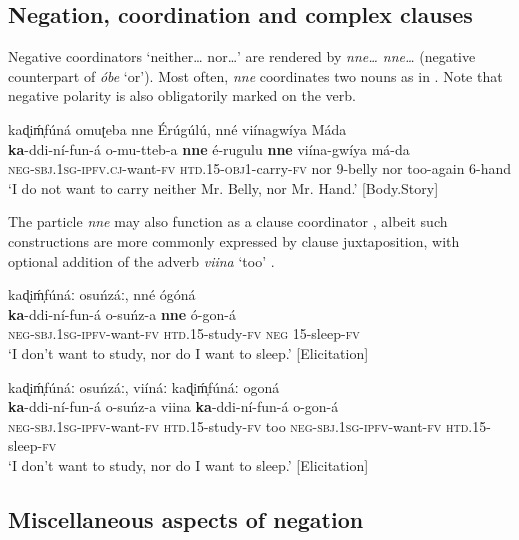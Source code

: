 \documentclass[output=paper,colorlinks=true, citecolor=brown,draftmode]{langscibook}
\begin{document}
\subsection{Negation, coordination and complex clauses}\label{sec:cuw:4.5}
Negative coordinators ‘neither… nor…’ are rendered by \textit{nne… nne…} (negative counterpart of \textit{óbe} ‘or’). Most often, \textit{nne} coordinates two nouns as in . Note that negative polarity is also obligatorily marked on the verb.

\ea\label{ex:cuw:79} kaɖiḿ̩fúná omuʈeba nne \'{E}rúgúlú, nné viínagwíya Máda \\
    \gll \textbf{ka}{}-ddi-ní-fun-á o-mu-tteb-a \textbf{nne} é-rugulu \textbf{nne} viína-gwíya má-da\\
          \textsc{neg-sbj.1}\textsc{sg}{}-\textsc{ipfv}.\textsc{cj}{}-want-\textsc{fv} \textsc{htd.15}{}-\textsc{obj1}{}-carry-\textsc{fv} nor 9-belly nor too-again 6-hand  \\
    \glt  ‘I do not want to carry neither Mr. Belly, nor Mr. Hand.’ [Body.Story]

\z 

The particle \textit{nne} may also function as a clause coordinator , albeit such constructions are more commonly expressed by clause juxtaposition, with optional addition of the adverb \textit{viina} ‘too’ . 

\ea\label{ex:cuw:80}
    \ea\label{ex:cuw:80a} kaɖiḿ̩fúnáː osuńzáː, nné ógóná\\ 
        \gll \textbf{ka}{}-ddi-ní-fun-á o-suńz-a \textbf{nne} ó-gon-á  \\
               \textsc{neg-sbj.1sg-ipfv}{}-want-\textsc{fv} \textsc{htd.15}{}-study-\textsc{fv} \textsc{neg} \textsc{15}{}-sleep-\textsc{fv}\\
        \glt  ‘I don’t want to study, nor do I want to sleep.’ [Elicitation]

    \ex\label{ex:cuw:80b} kaɖiḿ̩fúnáː osuńzáː, viínáː kaɖiḿ̩fúnáː ogoná \\
        \gll  \textbf{ka}{}-ddi-ní-fun-á o-suńz-a viina \textbf{ka}{}-ddi-ní-fun-á o-gon-á\\
               \textsc{neg-sbj.1sg-ipfv}{}-want-\textsc{fv} \textsc{htd.15}{}-study-\textsc{fv} too \textsc{neg-sbj.1sg-ipfv}{}-want-\textsc{fv} \textsc{htd.15}{}-sleep-\textsc{fv}\\
        \glt  ‘I don’t want to study, nor do I want to sleep.’ [Elicitation]
    \z
\z 

\subsection{Miscellaneous aspects of negation}\label{sec:cuw:4.6}
\end{document}
